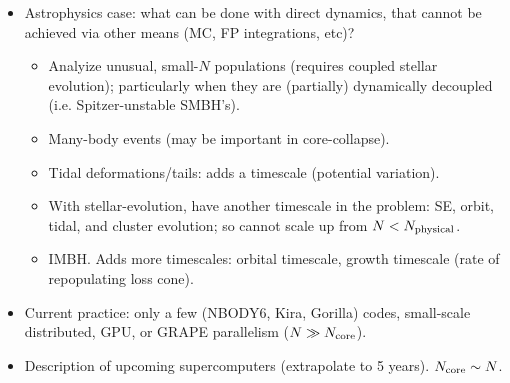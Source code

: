 \documentclass[5p,authoryear]{elsarticle}
\newcommand{\Ncore}{N_{\textnormal{core}}}
\begin{document}
\begin{itemize}
\item Astrophysics case: what can be done with direct dynamics, that
  cannot be achieved via other means (MC, FP integrations, etc)?  
  \begin{itemize}
  \item Analyize unusual, small-$N$ populations (requires coupled
    stellar evolution); particularly when they are (partially)
    dynamically decoupled (i.e. Spitzer-unstable SMBH's).
  \item Many-body events (may be important in core-collapse).
  \item Tidal deformations/tails: adds a timescale (potential
    variation).
  \item With stellar-evolution, have another timescale in the problem:
    SE, orbit, tidal, and cluster evolution; so cannot scale up from
    $N < N_{\textnormal{physical}}$.
  \item IMBH.  Adds more timescales: orbital timescale, growth
    timescale (rate of repopulating loss cone).
  \end{itemize}
\item Current practice: only a few (NBODY6, Kira, Gorilla) codes,
  small-scale distributed, GPU, or GRAPE parallelism ($N \gg \Ncore$).
\item Description of upcoming supercomputers (extrapolate to 5 years).
  $\Ncore \sim N$.  


\end{itemize}
\end{document}
